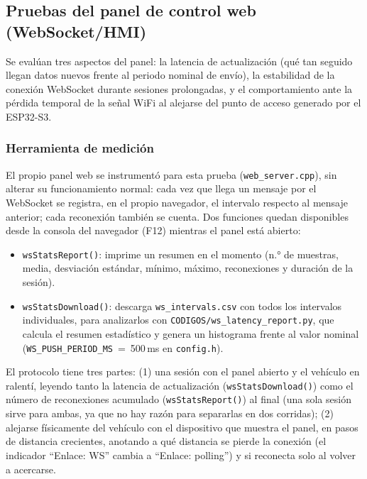 \subsection{Pruebas del panel de control web (WebSocket/HMI)}
\label{sec:pruebas_panel_web}

Se evalúan tres aspectos del panel: la latencia de actualización (qué tan seguido llegan datos nuevos frente al periodo nominal de envío), la estabilidad de la conexión WebSocket durante sesiones prolongadas, y el comportamiento ante la pérdida temporal de la señal WiFi al alejarse del punto de acceso generado por el ESP32-S3.

\subsubsection*{Herramienta de medición}

El propio panel web se instrumentó para esta prueba (\texttt{web\_server.cpp}), sin alterar su funcionamiento normal: cada vez que llega un mensaje por el WebSocket se registra, en el propio navegador, el intervalo respecto al mensaje anterior; cada reconexión también se cuenta. Dos funciones quedan disponibles desde la consola del navegador (F12) mientras el panel está abierto:

\begin{itemize}
	\item \texttt{wsStatsReport()}: imprime un resumen en el momento (n.° de muestras, media, desviación estándar, mínimo, máximo, reconexiones y duración de la sesión).
	\item \texttt{wsStatsDownload()}: descarga \texttt{ws\_intervals.csv} con todos los intervalos individuales, para analizarlos con \texttt{CODIGOS/ws\_latency\_report.py}, que calcula el resumen estadístico y genera un histograma frente al valor nominal (\texttt{WS\_PUSH\_PERIOD\_MS}~=~500\,ms en \texttt{config.h}).
\end{itemize}

El protocolo tiene tres partes: (1) una sesión con el panel abierto y el vehículo en ralentí, leyendo tanto la latencia de actualización (\texttt{wsStatsDownload()}) como el número de reconexiones acumulado (\texttt{wsStatsReport()}) al final (una sola sesión sirve para ambas, ya que no hay razón para separarlas en dos corridas); (2) alejarse físicamente del vehículo con el dispositivo que muestra el panel, en pasos de distancia crecientes, anotando a qué distancia se pierde la conexión (el indicador ``Enlace: WS'' cambia a ``Enlace: polling'') y si reconecta solo al volver a acercarse.

